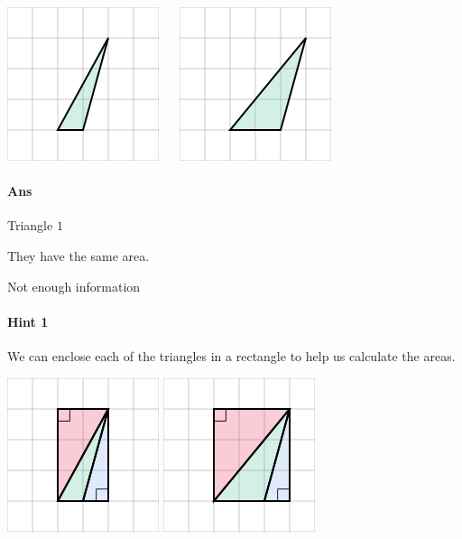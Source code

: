 \documentclass[twocolumn,10pt]{article}
\def\shrinkfactor{0.55}
\begin{document}
\includegraphics[scale=\shrinkfactor]{figures/c64b4d770bfcac7be00c3880806f0e6b75094446.png} $\quad$ 
\includegraphics[scale=\shrinkfactor]{figures/dc0e8470e25253d17fd6faaff4da3897941fe7e9.png}

\paragraph{Ans} 

Triangle $1$


 They have the same area.

Not enough information



\paragraph{Hint 1}We can enclose each of the triangles in a rectangle to help us calculate the areas.  

\includegraphics[scale=\shrinkfactor]{figures/4c4a94b2aca01211cb04207e5a823cc5d58570e3.png} 
\includegraphics[scale=\shrinkfactor]{figures/dec5586c9571e1ad5901d4114bd844888463acb4.png}
\end{document}
